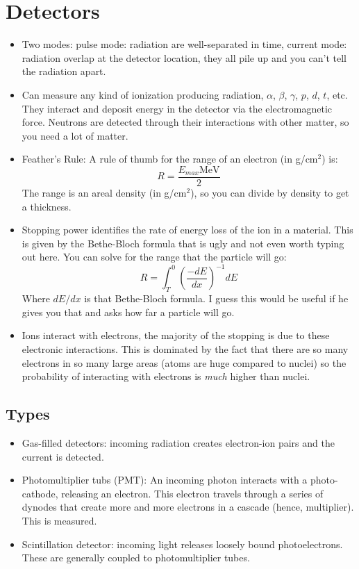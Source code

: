 \documentclass[letter]{article}
\begin{document}
\section{Detectors}
\begin{itemize}
\item Two modes: pulse mode: radiation are well-separated in time,
  current mode: radiation overlap at the detector
  location, they all pile up and you can't tell the radiation apart.~\cite[Lec. 36]{lecture}
\item Can measure any kind of ionization producing radiation,
  $\alpha$, $\beta$, $\gamma$, $p$, $d$, $t$, etc. They interact and
  deposit energy in the detector via the electromagnetic
  force. Neutrons are detected through their interactions with other
  matter, so you need a lot of matter.~\cite[Lec. 36]{lecture}
\item Feather's Rule: A rule of thumb for the range of an electron (in
  g/cm$^2$) is:
  \begin{equation*}
    R = \frac{E_{max} \text{MeV}}{2}
  \end{equation*}
The range is an areal density (in g/cm$^2$), so you can divide by
density to get a thickness.~\cite[Lec. 36]{lecture}
\item Stopping power identifies the rate of energy loss of the ion in
  a material. This is given by the Bethe-Bloch formula that is ugly
  and not even worth typing out here. You can solve for the range that
  the particle will go:
  \begin{equation*}
    R = \int^0_T{\left(\frac{-dE}{dx}\right)}^{-1}dE
  \end{equation*}
Where $dE/dx$ is that Bethe-Bloch formula. I guess this would be
useful if he gives you that and asks how far a particle will go.~\cite[Lec. 36]{lecture}
\item Ions interact with electrons, the majority of the stopping is
  due to these electronic interactions. This is dominated by the fact
  that there are so many electrons in so many large areas (atoms are
  huge compared to nuclei) so the probability of interacting with
  electrons is \textit{much} higher than nuclei.~\cite[Lec. 36]{lecture}
\end{itemize}
\subsection{Types}
\begin{itemize}
\item Gas-filled detectors: incoming radiation creates electron-ion
  pairs and the current is detected.~\cite[Lec.36]{lecture}
\item Photomultiplier tubs (PMT): An incoming photon interacts with a
  photo-cathode, releasing an electron. This electron travels through
  a series of dynodes that create more and more electrons in a
  cascade (hence, multiplier). This is
  measured.~\cite[Lec. 36]{lecture}
\item Scintillation detector: incoming light releases loosely bound
  photoelectrons. These are generally coupled to photomultiplier tubes.
\end{itemize}



\end{document}
